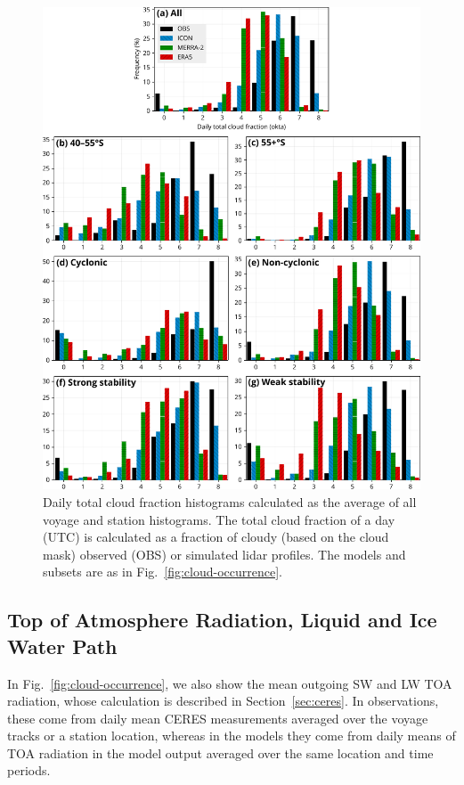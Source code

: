 \documentclass[draft]{agujournal2019}
\begin{document}
\begin{figure}[p!]
\centering
\includegraphics[width=\textwidth]{img/clt_hist_rev1.pdf}
\caption{
Daily total cloud fraction histograms calculated as the average of all voyage and station histograms. The total cloud fraction of a day (UTC) is calculated as a fraction of cloudy (based on the cloud mask) observed (OBS) or simulated lidar profiles. The models and subsets are as in Fig.~\ref{fig:cloud-occurrence}.
}
\label{fig:cloud-cover}
\end{figure}

\subsection{Top of Atmosphere Radiation, Liquid and Ice Water Path}
\label{sec:rad-lwp-iwp}

In Fig.~\ref{fig:cloud-occurrence}, we also show the mean outgoing SW and LW TOA radiation, whose calculation is described in Section~\ref{sec:ceres}. In observations, these come from daily mean CERES measurements averaged over the voyage tracks or a station location, whereas in the models they come from daily means of TOA radiation in the model output averaged over the same location and time periods.
\end{document}
